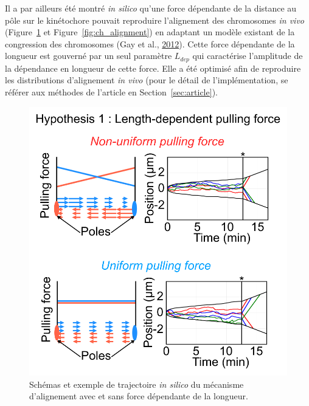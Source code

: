 \documentclass[12pt,a4paper,twoside,openright]{book}
\begin{document}
Il a par ailleurs été montré \emph{in silico} qu'une force dépendante de
la distance au pôle sur le kinétochore pouvait reproduire l'alignement
des chromosomes \emph{in vivo} (Figure~\ref{fig:hyp1} et
Figure~\ref{fig:ch_alignment}) en adaptant un modèle existant de la
congression des chromosomes (Gay et al., \hyperref[ref-Gay2012a]{2012}).
Cette force dépendante de la longueur est gouverné par un seul paramètre
\(L_{dep}\) qui caractérise l'amplitude de la dépendance en longueur de
cette force. Elle a été optimisé afin de reproduire les distributions
d'alignement \emph{in vivo} (pour le détail de l'implémentation, se
référer aux méthodes de l'article en Section~\ref{sec:article}).

\begin{figure}[htbp]
\centering
\includegraphics{figures/results/modelling/hyp1.png}
\caption[Premier mécanisme expliquant l'alignement des chromosomes]{\label{fig:hyp1}Schémas
et exemple de trajectoire \emph{in silico} du mécanisme d'alignement
avec et sans force dépendante de la longueur.}
\end{figure}
\end{document}
